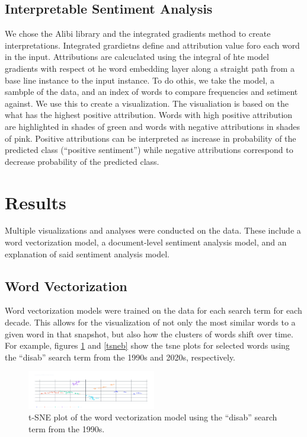 \documentclass[11pt,a4paper, twocolumn]{article}
\begin{document}
\subsection{Interpretable Sentiment Analysis}
We chose the Alibi library and the integrated gradients method to create interpretations. Integrated grardietns define and attribution value foro each word in the input. Attributions are calcuclated using the integral of hte model gradients with respect ot he word embedding layer along a straight path from a base line instance to the input instance. To do othis, we take the model, a sambple of the data, and an index of words to compare frequencies and setiment against. We use this to create a visualization. The visualiation is based on the what has the highest positive attribution. Words with high positive attribution are highlighted in shades of green and words with negative attributions in shades of pink. Positive attributions can be interpreted as increase in probability of the predicted class (``positive sentiment'') while negative attributions correspond to decrease probability of the predicted class.

\section{Results}
Multiple visualizations and analyses were conducted on the data. These include a word vectorization model, a document-level sentiment analysis model, and an explanation of said sentiment analysis model.

\subsection{Word Vectorization}

Word vectorization models were trained on the data for each search term for each decade. This allows for the visualization of not only the most similar words to a given word in that snapshot, but also how the clusters of words shift over time. For example, figures \ref{tsnea} and \ref{tsneb} show the tsne plots for selected words using the ``disab'' search term from the 1990s and 2020s, respectively.

\begin{figure}
  \centering
  \includegraphics[width=0.5\textwidth]{lemma_disab_1990_simword.png}
  \caption{\label{tsnea} t-SNE plot of the word vectorization model using the ``disab'' search term from the 1990s.}
  
\end{figure}
  
\end{document}
